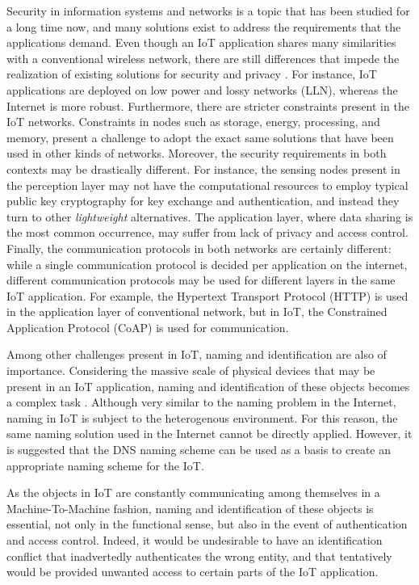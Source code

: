 \documentclass[12pt]{article}
\begin{document}
Security in information systems and networks is a topic that has been studied for a long time now, and many solutions exist to address the requirements that the applications demand. Even though an IoT application shares many similarities with a conventional wireless network, there are still differences that impede the realization of existing solutions for security and privacy \cite{ALABA201710}. For instance, IoT applications are deployed on low power and lossy networks (LLN), whereas the Internet is more robust. Furthermore, there are stricter constraints present in the IoT networks. Constraints in nodes such as storage, energy, processing, and memory, present a challenge to adopt the exact same solutions that have been used in other kinds of networks. Moreover, the security requirements in both contexts may be drastically different. For instance, the sensing nodes present in the perception layer may not have the computational resources to employ typical public key cryptography for key exchange and authentication, and instead they turn to other \emph{lightweight} alternatives. The application layer, where data sharing is the most common occurrence, may suffer from lack of privacy and access control. Finally, the communication protocols in both networks are certainly different: while a single communication protocol is decided per application on the internet, different communication protocols may be used for different layers in the same IoT application. For example, the Hypertext Transport Protocol (HTTP) is used in the application layer of conventional network, but in IoT, the Constrained Application Protocol (CoAP) is used for communication.

Among other challenges present in IoT, naming and identification are also of importance. Considering the massive scale of physical devices that may be present in an IoT application, naming and identification of these objects becomes a complex task \cite{Zhang:2015}. Although very similar to the naming problem in the Internet, naming in IoT is subject to the heterogenous environment. For this reason, the same naming solution used in the Internet cannot be directly applied. However, it is suggested \cite{Zhang:2015} that the DNS naming scheme can be used as a basis to create an appropriate naming scheme for the IoT. 

As the objects in IoT are constantly communicating among themselves in a Machine-To-Machine fashion, naming and identification of these objects is essential, not only in the functional sense, but also in the event of authentication and access control. Indeed, it would be undesirable to have an identification conflict that inadvertedly authenticates the wrong entity, and that tentatively would be provided unwanted access to certain parts of the IoT application.
\end{document}
